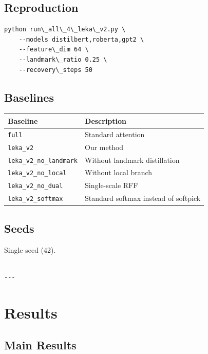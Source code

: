 \subsection{Reproduction}

\begin{lstlisting}
python run\_all\_4\_leka\_v2.py \
    --models distilbert,roberta,gpt2 \
    --feature\_dim 64 \
    --landmark\_ratio 0.25 \
    --recovery\_steps 50
\end{lstlisting}

\subsection{Baselines}

\begin{table}[H]
\centering
\small
\begin{tabular}{ll}
\toprule
\textbf{Baseline} & \textbf{Description} \\
\midrule
\texttt{full} & Standard attention \\
\texttt{leka\_v2} & Our method \\
\texttt{leka\_v2\_no\_landmark} & Without landmark distillation \\
\texttt{leka\_v2\_no\_local} & Without local branch \\
\texttt{leka\_v2\_no\_dual} & Single-scale RFF \\
\texttt{leka\_v2\_softmax} & Standard softmax instead of softpick \\
\bottomrule
\end{tabular}
\end{table}

\subsection{Seeds}

Single seed (42).
\begin{lstlisting}

---
\end{lstlisting}

\section{Results}

\subsection{Main Results}

